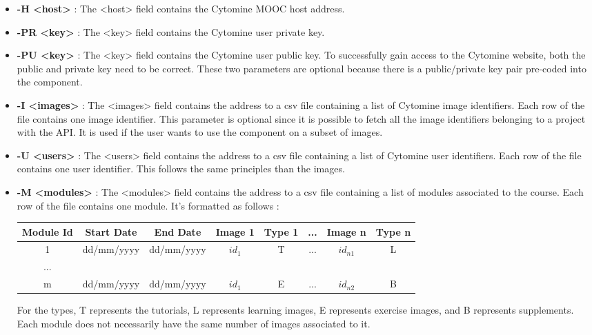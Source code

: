 \documentclass[a4paper,11pt]{report}
\numberwithin{figure}{section} %
\begin{document}
        \begin{itemize}
            \item[\textbullet] \textbf{-H <host>} : The <host> field contains the Cytomine MOOC host address.
            \item[\textbullet] \textbf{-PR <key>} : The <key> field contains the Cytomine user private key.
            \item[\textbullet] \textbf{-PU <key>} : The <key> field contains the Cytomine user public key.
            To successfully gain access to the Cytomine website, both the public and private key need to be correct.
            These two parameters are optional because there is a public/private key pair pre-coded into the component.
            \item[\textbullet] \textbf{-I <images>} : The <images> field contains the address to a csv file containing a list of Cytomine image identifiers.
            Each row of the file contains one image identifier.
            This parameter is optional since it is possible to fetch all the image identifiers belonging to a project with the API.
            It is used if the user wants to use the component on a subset of images.
            \item[\textbullet] \textbf{-U <users>} : The <users> field contains the address to a csv file containing a list of Cytomine user identifiers.
            Each row of the file contains one user identifier.
            This follows the same principles than the images.
            \item[\textbullet] \textbf{-M <modules>} : The <modules> field contains the address to a csv file containing a list of modules associated to the course.
            Each row of the file contains one module.
            It's formatted as follows :\newline

              \begin{tabular}{| c | c | c | c | c | c | c | c |}
              \hline
              \tiny{Module Id} & \tiny{Start Date} & \tiny{End Date} & \tiny{Image 1} & \tiny{Type 1} & \tiny{...} & \tiny{Image n} & \tiny{Type n}\\ \hline
              \tiny{1} & \tiny{dd/mm/yyyy} & \tiny{dd/mm/yyyy} & \tiny{$id_1$} & \tiny{T} & \tiny{...} & \tiny{$id_{n1}$} & \tiny{L}\\ \hline
              \tiny{...} & & & & & & & \\ \hline
              \tiny{m} & \tiny{dd/mm/yyyy} & \tiny{dd/mm/yyyy} & \tiny{$id_1$} & \tiny{E} & \tiny{...} & \tiny{$id_{n2}$} & \tiny{B}\\ \hline
              \end{tabular}\newline

            For the types, T represents the tutorials, L represents learning images, E represents exercise images, and B represents supplements.
            Each module does not necessarily have the same number of images associated to it.
        \end{itemize}
\end{document}
